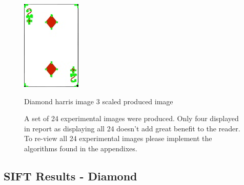 \documentclass[conference]{IEEEtran}
\begin{document}
\begin{figure}[!htb]
\begin{minipage}[b]{0.2\textwidth}
    \includegraphics[width=\textwidth]{../programme/results/Task_1/scaled_experiements/Harris/diamond/image_3.jpg}
    \caption{Diamond harris image 3 scaled produced image}
    \label{Diamond harris image 3 scaled produced image}
  \end{minipage}
  {\caption*{A set of 24 experimental images were produced. Only four displayed in report as displaying all 24 doesn't add great benefit to the reader. To re-view all 24 experimental images please implement the algorithms found in the appendixes.}}
\end{figure}

\subsection{SIFT Results - Diamond}
\end{document}
